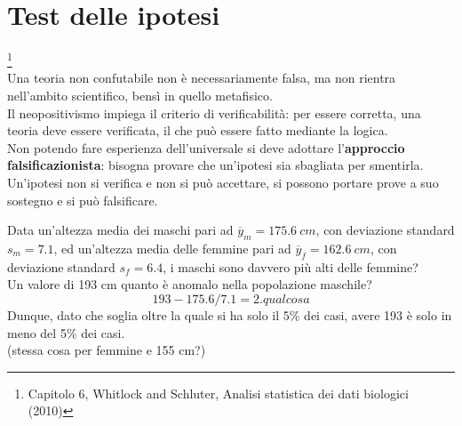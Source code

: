 \documentclass[10pt, draft]{book}
\newcounter{example}[section]
\begin{document}
\chapter{Test delle ipotesi}\footnote{Capitolo 6, Whitlock and Schluter, Analisi statistica dei dati biologici (2010)}
\\
Una teoria non confutabile non è necessariamente falsa, ma non rientra nell'ambito scientifico, bensì in quello metafisico.
\\
Il neopositivismo impiega il criterio di verificabilità: per essere corretta, una teoria deve essere verificata, il che può essere fatto mediante la logica.
\\
Non potendo fare esperienza dell'universale si deve adottare l'\textbf{approccio falsificazionista}: bisogna provare che un'ipotesi sia sbagliata per smentirla.
\\
Un'ipotesi non si verifica e non si può accettare, si possono portare prove a suo sostegno e si può falsificare.
\begin{example}
    Data un'altezza media dei maschi pari ad $\overline{y}_m = 175.6\ cm$, con deviazione standard $s_m= 7.1$, ed un'altezza media delle femmine pari ad $\overline{y}_f = 162.6\ cm$, con deviazione standard $s_f= 6.4$, i maschi sono davvero più alti delle femmine?
    \\
    Un valore di 193 cm quanto è anomalo nella popolazione maschile?
    \begin{equation}
        193-175.6/7.1 = 2.qualcosa
    \end{equation} 
    Dunque, dato che soglia oltre la quale si ha solo il 5\% dei casi, avere 193 è solo in meno del 5\% dei casi.
    \\
    (stessa cosa per femmine e 155 cm?)
\end{example}
\clearpage
\end{document}
